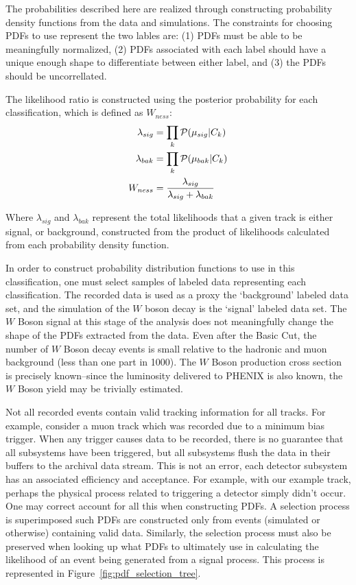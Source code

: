 The probabilities described here are realized through constructing probability
density functions from the data and simulations. The constraints for choosing
PDFs to use represent the two lables are: (1) PDFs must be able to be
meaningfully normalized, (2) PDFs associated with each label should have a
unique enough shape to differentiate between either label, and (3) the PDFs
should be uncorrellated.
 

The likelihood ratio is constructed using the posterior probability
for each classification, which is defined as $W_{ness}$:
\begin{align*}
  \lambda_{sig} &= \prod_{k}\mathcal{P}(\mu_{sig}\vert C_k)\\
  \lambda_{bak} &= \prod_{k}\mathcal{P}(\mu_{bak}\vert C_k)\\
  W_{ness} &= { 
    {\lambda_{sig}}
    \over 
    {\lambda_{sig}+\lambda_{bak}} 
  }\label{eq:wness_calculation}
\end{align*}

{\noindent}Where $\lambda_{sig}$ and $\lambda_{bak}$ represent the total
likelihoods that a given track is either signal, or background, constructed from
the product of likelihoods calculated from each probability density function.

In order to construct probability distribution functions to use in this
classification, one must select samples of labeled data representing each
classification. The recorded data is used as a proxy the `background' labeled
data set, and the simulation of the $W$ boson decay is the `signal' labeled data
set. The $W$ Boson signal at this stage of the analysis does not meaningfully
change the shape of the PDFs extracted from the data. Even after the Basic Cut,
the number of $W$ Boson decay events is small relative to the hadronic and muon
background (less than one part in 1000). The $W$ Boson production cross section
is precisely known--since the luminosity delivered to PHENIX is also known, the
$W$ Boson yield may be trivially estimated.

Not all recorded events contain valid tracking information for all tracks. For
example, consider a muon track which was recorded due to a minimum bias trigger.
When any trigger causes data to be recorded, there is no guarantee that all
subsystems have been triggered, but all subsystems flush the data in their
buffers to the archival data stream. This is not an error, each detector
subsystem has an associated efficiency and acceptance.  For example, with our
example track, perhaps the physical process related to triggering a detector
simply didn't occur. One may correct account for all this when constructing
PDFs.  A selection process is superimposed such PDFs are constructed only from
events (simulated or otherwise) containing valid data. Similarly, the selection
process must also be preserved when looking up what PDFs to ultimately use in
calculating the likelihood of an event being generated from a signal process.
This process is represented in Figure~\ref{fig:pdf_selection_tree}.

